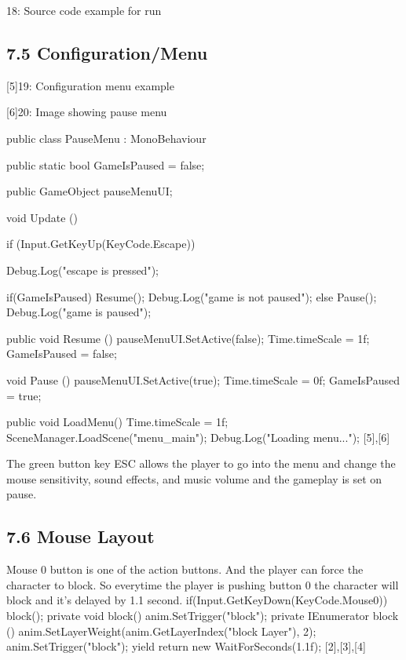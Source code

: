 \documentclass{article}
\begin{document}
\begin{titlepage}
[2][3][4]18: Source code example for run
\subsection{ 7.5 Configuration/Menu }

[5]19: Configuration menu example


[6]20: Image showing pause menu




public class PauseMenu : MonoBehaviour
{
    public static bool GameIsPaused = false;

    public GameObject pauseMenuUI;

    void Update ()
    {
            if (Input.GetKeyUp(KeyCode.Escape))
            {
                    Debug.Log("escape is pressed");

                    if(GameIsPaused)
                    {
                        Resume();
                        Debug.Log("game is not paused");
                    } else {
                    Pause();
                    Debug.Log("game is paused");
                }
        }
}
 public void Resume ()
{
        pauseMenuUI.SetActive(false);
        Time.timeScale = 1f;
        GameIsPaused = false;
}
    
void Pause ()
{
        pauseMenuUI.SetActive(true);
        Time.timeScale = 0f;
        GameIsPaused = true;
}

public void LoadMenu()
{
        Time.timeScale = 1f;
        SceneManager.LoadScene("menu_main");
        Debug.Log("Loading menu...");
}
[5],[6]



The green button key ESC allows the player to go into the menu and change the mouse sensitivity, sound effects, and music volume and the gameplay is set on pause. 

\subsection{ 7.6 Mouse Layout }
Mouse 0 button is one of the action buttons. And the player can force the character to block. So everytime the player is pushing button 0 the character will block  and it’s delayed by 1.1 second. 
        if(Input.GetKeyDown(KeyCode.Mouse0))
        {
            block();
        }
    private void block()
    {
        anim.SetTrigger("block");
    }
    private IEnumerator block ()
    {
        anim.SetLayerWeight(anim.GetLayerIndex("block Layer"), 2);
        anim.SetTrigger("block");
        yield return new WaitForSeconds(1.1f);
    }
[2],[3],[4]

}
\end{titlepage}
\end{document}
